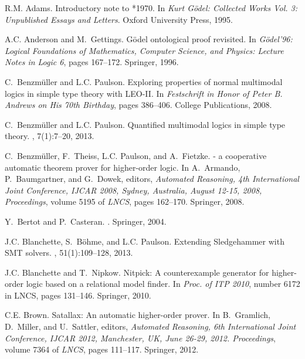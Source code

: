 \documentclass{easychair}
\begin{document}

%
\begin{thebibliography}{10}

R.M. Adams.
\newblock Introductory note to *1970.
\newblock In {\em {Kurt G\"odel: Collected Works Vol. 3: Unpublished Essays and
  Letters}}. Oxford University Press, 1995.

A.C. Anderson and M.~Gettings.
\newblock G\"odel ontological proof revisited.
\newblock In {\em {G\"odel'96: Logical Foundations of Mathematics, Computer
  Science, and Physics: Lecture Notes in Logic 6}}, pages 167--172. {Springer},
  1996.

C.~Benzm{\"u}ller and L.C. Paulson.
\newblock Exploring properties of normal multimodal logics in simple type
  theory with {LEO-II}.
\newblock In {\em {Festschrift in Honor of {Peter B. Andrews} on His 70th
  Birthday}}, pages 386--406. College Publications, 2008.

C.~Benzm{\"u}ller and L.C. Paulson.
\newblock Quantified multimodal logics in simple type theory.
,
  7(1):7--20, 2013.

C.~Benzm{\"u}ller, F.~Theiss, L.C. Paulson, and A.~Fietzke.
 - a cooperative automatic theorem prover for higher-order
  logic.
\newblock In A.~Armando, P.~Baumgartner, and G.~Dowek, editors, {\em Automated
  Reasoning, 4th International Joint Conference, IJCAR 2008, Sydney, Australia,
  August 12-15, 2008, Proceedings}, volume 5195 of {\em LNCS}, pages 162--170.
  Springer, 2008.

Y.~Bertot and P.~Casteran.
.
\newblock Springer, 2004.

J.C. Blanchette, S.~B\"ohme, and L.C. Paulson.
\newblock Extending {Sledgehammer} with {SMT} solvers.
, 51(1):109--128, 2013.

J.C. Blanchette and T.~Nipkow.
\newblock Nitpick: A counterexample generator for higher-order logic based on a
  relational model finder.
\newblock In {\em Proc. of ITP 2010}, number 6172 in LNCS, pages 131--146.
  Springer, 2010.

C.E. Brown.
\newblock Satallax: An automatic higher-order prover.
\newblock In B.~Gramlich, D.~Miller, and U.~Sattler, editors, {\em Automated
  Reasoning, 6th International Joint Conference, IJCAR 2012, Manchester, UK,
  June 26-29, 2012. Proceedings}, volume 7364 of {\em LNCS}, pages 111--117.
  Springer, 2012.


\end{thebibliography}
\end{document}
